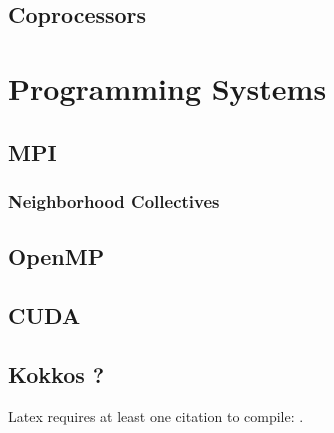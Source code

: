 \subsection{Coprocessors}

\section{Programming Systems}

\subsection{MPI}

\subsubsection{Neighborhood Collectives}

\subsection{OpenMP}

\subsection{CUDA}

\subsection{Kokkos ?}

Latex requires at least one citation to
compile: \cite{edwards2013kokkos}.

